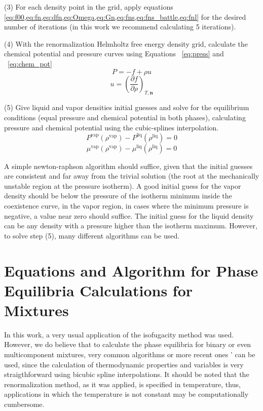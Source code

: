 \documentclass[preprint,12pt,3p]{elsarticle}
\begin{document}
\begin{appendices}
(3) For each density point in the grid, apply equations
\cref{eq:f00,eq:fn,eq:dfn,eq:Omega,eq:Gn,eq:fns,eq:fns_battle,eq:fnl} for the desired number of iterations (in this work we recommend calculating 5 iterations).

(4) With the renormalization Helmholtz free energy density grid, calculate the chemical potential and pressure curves using Equations ~\ref{eq:press} and ~\ref{eq:chem_pot}
\begin{equation} \label{eq:press}
P = -f+\rho u
\end{equation}
\begin{equation} \label{eq:chem_pot}
u = \left(\frac{\partial f}{\partial \rho}\right)_{T,\textbf{n}}
\end{equation}

(5) Give liquid and vapor densities initial guesses and solve for the equilibrium conditions (equal pressure and chemical potential in both phases), calculating pressure and chemical potential using the cubic-splines interpolation.
\begin{equation} \label{eq:equal_press}
P^\mathrm{vap}(\rho^\mathrm{vap}) - P^\mathrm{liq}(\rho^\mathrm{liq}) = 0
\end{equation}
\begin{equation} \label{eq:equal_chem_pot}
\mu^\mathrm{vap}(\rho^\mathrm{vap}) - \mu^\mathrm{liq}(\rho^\mathrm{liq}) = 0
\end{equation} 

A simple newton-raphson algorithm should suffice, given that the initial guesses are consistent and far away from the trivial solution (the root at the mechanically unstable region at the pressure isotherm).
A good initial guess for the vapor density should be below the pressure of the isotherm minimum inside the coexistence curve, in the vapor region, in cases where the minimum pressure is negative, a value near zero should suffice.
The initial guess for the liquid density can be any density with a pressure higher than the isotherm maximum.
However, to solve step (5), many different algorithms can be used.

\setcounter{equation}{0}
\section{Equations and Algorithm for Phase Equilibria Calculations for Mixtures}
\label{app:mixtures}

In this work, a very usual application of the isofugacity method was used.
However, we do believe that to calculate the phase equilibria for binary or even multicomponent mixtures, very common algorithms  \cite{michelsen1982isothermal1,michelsen1982isothermal} or more recent ones '  \cite{segtovich2016simultaneous,gupta1991method} can be used, since the calculation of thermodynamic properties and variables is very straigthforward using bicubic spline interpolations.
It should be noted that the renormalization method, as it was applied, is specified in temperature, thus, applications in which the temperature is not constant may be computationally cumbersome.


\end{appendices}
\end{document}
